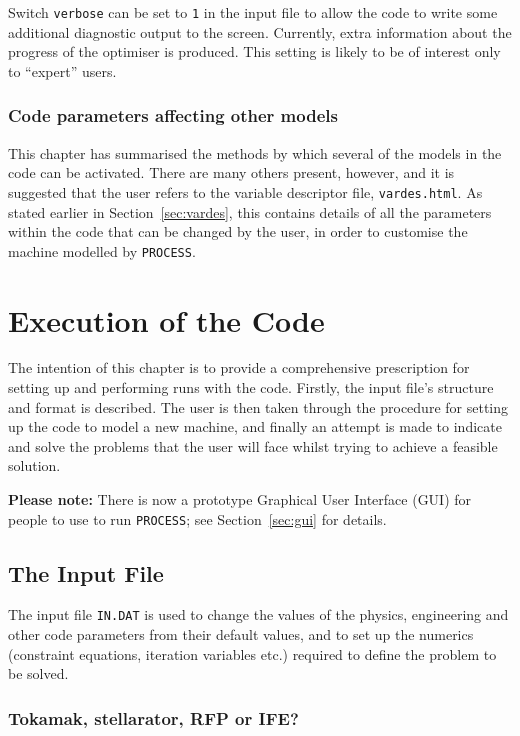 \documentclass[11pt,a4paper]{report}
\newcommand{\process}{\mbox{\texttt{PROCESS}}}
\newcommand{\setheader}[1]
 {\markright{\rlap{\lower0.8ex\hbox to\textwidth{\hrulefill}}{\bf#1}}}
\newcommand{\mychapter}[1]{\small\normalsize
 \setcounter{footnote}{0}
 \chapter{#1}
 \pagestyle{myheadings}
 \setheader{Chapter \thechapter\hspace{0.8em}#1}}
\begin{document}
Switch \texttt{verbose} can be set to \texttt{1} in the input file to allow
the code to write some additional diagnostic output to the screen. Currently,
extra information about the progress of the optimiser is produced. This
setting is likely to be of interest only to ``expert'' users.

\subsection{Code parameters affecting other models}

This chapter has summarised the methods by which several of the models in the
code can be activated. There are many others present, however, and it is
suggested that the user refers to the variable descriptor file,
\texttt{vardes.html}. As stated earlier in Section~\ref{sec:vardes}, this
contains details of all the parameters within the code that can be changed by
the user, in order to customise the machine modelled by \process.


\mychapter{Execution of the Code}
\label{chap:run}

The intention of this chapter is to provide a comprehensive prescription for
setting up and performing runs with the code.  Firstly, the input file's
structure and format is described. The user is then taken through the
procedure for setting up the code to model a new machine, and finally an
attempt is made to indicate and solve the problems that the user will face
whilst trying to achieve a feasible solution.

\textbf{Please note:} There is now a prototype Graphical User Interface (GUI)
for people to use to run \process; see Section~\ref{sec:gui} for details.

\section{The Input File}
\label{sec:infile}

The input file \texttt{IN.DAT} is used to change the values of the physics,
engineering and other code parameters from their default values, and to set up
the numerics (constraint equations, iteration variables etc.) required to
define the problem to be solved.

\subsection{Tokamak, stellarator, RFP or IFE?}
\label{sec:device}
\end{document}
